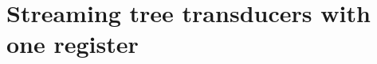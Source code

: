 \section{Streaming tree transducers with one register}
\label{sec:one-register}


\begin{proposition}\label{prop:one-register} 
    
\end{proposition}